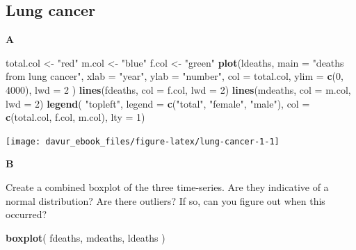 \documentclass[]{book}
\newenvironment{Shaded}{\begin{snugshade}}{\end{snugshade}}
\newcommand{\DataTypeTok}[1]{\textcolor[rgb]{0.13,0.29,0.53}{#1}}
\newcommand{\DecValTok}[1]{\textcolor[rgb]{0.00,0.00,0.81}{#1}}
\newcommand{\KeywordTok}[1]{\textcolor[rgb]{0.13,0.29,0.53}{\textbf{#1}}}
\newcommand{\NormalTok}[1]{#1}
\newcommand{\StringTok}[1]{\textcolor[rgb]{0.31,0.60,0.02}{#1}}
\begin{document}
\hypertarget{lung-cancer-1}{%
\subsection{Lung cancer}\label{lung-cancer-1}}

\textbf{A}

\begin{Shaded}
\begin{Highlighting}[]
\NormalTok{total.col <-}\StringTok{ "red"}
\NormalTok{m.col <-}\StringTok{ "blue"}
\NormalTok{f.col <-}\StringTok{ "green"}
\KeywordTok{plot}\NormalTok{(ldeaths,}
         \DataTypeTok{main =} \StringTok{"deaths from lung cancer"}\NormalTok{,}
         \DataTypeTok{xlab =} \StringTok{"year"}\NormalTok{,}
         \DataTypeTok{ylab =} \StringTok{"number"}\NormalTok{,}
         \DataTypeTok{col =}\NormalTok{ total.col,}
         \DataTypeTok{ylim =} \KeywordTok{c}\NormalTok{(}\DecValTok{0}\NormalTok{, }\DecValTok{4000}\NormalTok{),}
         \DataTypeTok{lwd =} \DecValTok{2}
\NormalTok{)}
\KeywordTok{lines}\NormalTok{(fdeaths, }\DataTypeTok{col =}\NormalTok{ f.col, }\DataTypeTok{lwd =} \DecValTok{2}\NormalTok{)}
\KeywordTok{lines}\NormalTok{(mdeaths, }\DataTypeTok{col =}\NormalTok{ m.col, }\DataTypeTok{lwd =} \DecValTok{2}\NormalTok{)}
\KeywordTok{legend}\NormalTok{(}
    \StringTok{"topleft"}\NormalTok{, }
    \DataTypeTok{legend =} \KeywordTok{c}\NormalTok{(}\StringTok{"total"}\NormalTok{, }\StringTok{"female"}\NormalTok{, }\StringTok{"male"}\NormalTok{), }
    \DataTypeTok{col =} \KeywordTok{c}\NormalTok{(total.col, f.col, m.col), }
    \DataTypeTok{lty =} \DecValTok{1}\NormalTok{)}
\end{Highlighting}
\end{Shaded}

\begin{center}\texttt{[image: davur\_ebook\_files/figure-latex/lung-cancer-1-1]} \end{center}

\textbf{B}

Create a combined boxplot of the three time-series. Are they indicative of a normal distribution? Are there outliers? If so, can you figure out when this occurred?

\begin{Shaded}
\begin{Highlighting}[]
\KeywordTok{boxplot}\NormalTok{(}
\NormalTok{    fdeaths, mdeaths, ldeaths}
\NormalTok{)}
\end{Highlighting}
\end{Shaded}
\end{document}

